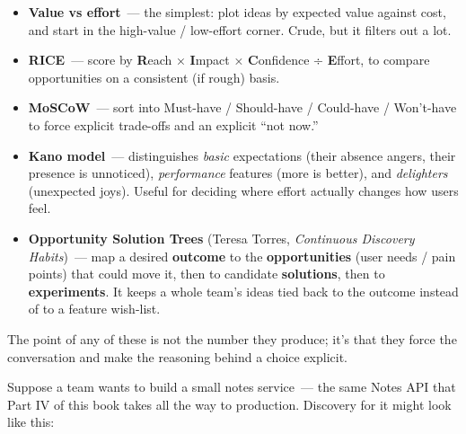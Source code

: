 \begin{itemize}
\tightlist
\item
  \textbf{Value vs effort}~--- the simplest: plot ideas by expected value against cost, and start in the
  high-value / low-effort corner. Crude, but it filters out a lot.
\item
  \textbf{RICE}~--- score by \textbf{R}each × \textbf{I}mpact × \textbf{C}onfidence ÷ \textbf{E}ffort, to compare opportunities
  on a consistent (if rough) basis.
\item
  \textbf{MoSCoW}~--- sort into Must-have / Should-have / Could-have / Won't-have to force explicit
  trade-offs and an explicit ``not now.''
\item
  \textbf{Kano model}~--- distinguishes \emph{basic} expectations (their absence angers, their presence is
  unnoticed), \emph{performance} features (more is better), and \emph{delighters} (unexpected joys). Useful for
  deciding where effort actually changes how users feel.
\item
  \textbf{Opportunity Solution Trees} (Teresa Torres, \emph{Continuous Discovery Habits})~--- map a desired \textbf{outcome}
  to the \textbf{opportunities} (user needs / pain points) that could move it, then to candidate
  \textbf{solutions}, then to \textbf{experiments}. It keeps a whole team's ideas tied back to the outcome
  instead of to a feature wish-list.
\end{itemize}

\noindent{}The point of any of these is not the number they produce; it's that they force the conversation and
make the reasoning behind a choice explicit.

\label{product-discovery:a-worked-example-discovery-for-a-notes-service}

Suppose a team wants to build a small notes service~--- the same Notes API that Part IV of this book
takes all the way to production. Discovery for it might look like this:

